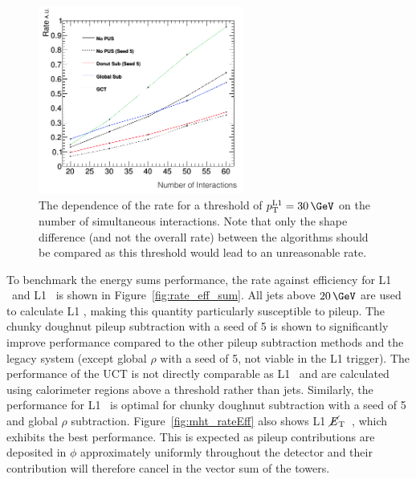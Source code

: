 \begin{figure}
\centering
    \includegraphics[width=0.6\textwidth]{./Figures/triggerUpgrade/neutrinonvtx_jet1}
  \caption{The dependence of the rate for a threshold of $\Lonept=30\,\GeV$ on the number of simultaneous interactions. Note
  that only the shape difference (and not the overall rate) between the algorithms should be compared 
  as this \Lonept threshold would lead to an unreasonable rate.}
  \label{fig:rate_nvtx}
\end{figure}

To benchmark the energy sums performance, the rate against efficiency for L1 \scalht~and L1 \mht~is shown in Figure~\ref{fig:rate_eff_sum}.
All jets above $20\,\GeV$ are used to calculate L1 \scalht, making this quantity particularly susceptible to pileup. The chunky doughnut 
pileup subtraction with a seed of 5 is shown to significantly improve performance compared to the other pileup subtraction
methods and the legacy system (except global $\rho$ with a seed of 5, not viable in the L1 trigger). The performance of the UCT is not 
directly comparable as L1 \scalht~and \mht are calculated using calorimeter regions above a threshold rather than jets. Similarly, the performance for 
L1 \mht~is optimal for chunky doughnut subtraction with a seed of 5 and global $\rho$ subtraction. 
Figure~\ref{fig:mht_rateEff} also shows L1 $\mbox{$\cancel{E}_\text{T}$}$~, which exhibits the best performance. This is expected as 
pileup contributions are deposited in $\phi$ approximately uniformly throughout the detector and their contribution will
therefore cancel in the vector sum of the towers.


